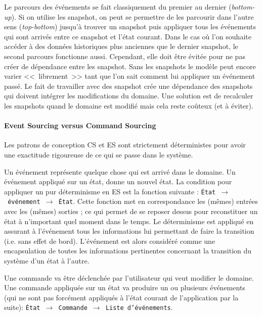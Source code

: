 Le parcours des événements se fait classiquement du premier au dernier 
(\textit{bottom-up}). Si on utilise les \gls{snapshot}, on peut se permettre de les 
parcourir dans l'autre sens (\textit{top-bottom}) jusqu'à trouver un \gls{snapshot} 
puis appliquer tous les événements qui sont arrivés entre ce \gls{snapshot} et 
l'état courant. Dans le cas où l'on souhaite accéder à des données historiques 
plus anciennes que le dernier \gls{snapshot}, le second parcours fonctionne 
aussi. Cependant, elle doit être évitée pour ne pas créer de dépendance entre 
les \gls{snapshot}. Sans les snapshots le modèle peut encore varier 
<<~librement~>> tant que l'on sait comment lui appliquer un événement passé. 
Le fait de travailler avec des \gls{snapshot} crée une dépendance des 
snapshots qui doivent intégrer les modifications du domaine. Une solution est 
de recalculer les snapshots quand le domaine est modifié mais cela reste 
coûteux (et à éviter).

\paragraph{Event Sourcing versus Command Sourcing}
Les patrons de conception \gls{CS} et \gls{ES} sont strictement déterministes pour 
avoir une exactitude rigoureuse de ce qui se passe dans le système.

Un événement représente quelque chose qui est arrivé dans le domaine. Un 
événement appliqué sur un état, donne un nouvel état. 
La condition pour appliquer un pur déterminisme en \gls{ES} est la fonction 
suivante : \texttt{État~$\rightarrow$~événement~$\rightarrow$~État}. 
Cette fonction met en correspondance les (mêmes) entrées avec les (mêmes) 
sorties ; ce qui permet de se reposer dessus pour reconstituer un état à 
n'important quel moment dans le temps. 
Le déterminisme est appliqué en assurant à l'événement tous les 
informations lui permettant de faire la transition (i.e. sans effet de bord). 
L'événement est alors considéré comme une encapsulation de toutes les 
informations pertinentes concernant la transition du système d'un état à l'autre.

Une commande va être déclenchée par l'utilisateur qui veut modifier le domaine. 
Une commande appliquée sur un état va produire un ou plusieurs événements (qui 
ne sont pas forcément appliqués à l'état courant de l'application par la suite): 
\texttt{État~$\rightarrow$~Commande~$\rightarrow$~Liste d'événements}.

